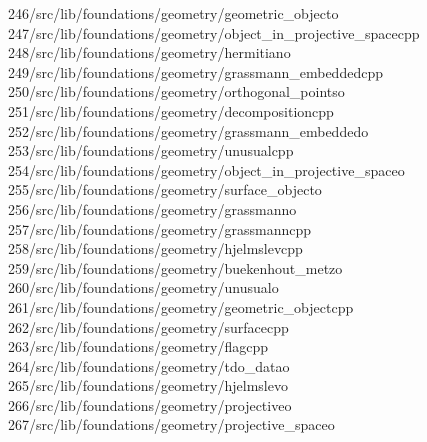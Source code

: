 \begin{tabbing}
246\>/src/lib/foundations/geometry/geometric\_objecto\\[0pt]
247\>/src/lib/foundations/geometry/object\_in\_projective\_spacecpp\\[0pt]
248\>/src/lib/foundations/geometry/hermitiano\\[0pt]
249\>/src/lib/foundations/geometry/grassmann\_embeddedcpp\\[0pt]
250\>/src/lib/foundations/geometry/orthogonal\_pointso\\[0pt]
251\>/src/lib/foundations/geometry/decompositioncpp\\[0pt]
252\>/src/lib/foundations/geometry/grassmann\_embeddedo\\[0pt]
253\>/src/lib/foundations/geometry/unusualcpp\\[0pt]
254\>/src/lib/foundations/geometry/object\_in\_projective\_spaceo\\[0pt]
255\>/src/lib/foundations/geometry/surface\_objecto\\[0pt]
256\>/src/lib/foundations/geometry/grassmanno\\[0pt]
257\>/src/lib/foundations/geometry/grassmanncpp\\[0pt]
258\>/src/lib/foundations/geometry/hjelmslevcpp\\[0pt]
259\>/src/lib/foundations/geometry/buekenhout\_metzo\\[0pt]
260\>/src/lib/foundations/geometry/unusualo\\[0pt]
261\>/src/lib/foundations/geometry/geometric\_objectcpp\\[0pt]
262\>/src/lib/foundations/geometry/surfacecpp\\[0pt]
263\>/src/lib/foundations/geometry/flagcpp\\[0pt]
264\>/src/lib/foundations/geometry/tdo\_datao\\[0pt]
265\>/src/lib/foundations/geometry/hjelmslevo\\[0pt]
266\>/src/lib/foundations/geometry/projectiveo\\[0pt]
267\>/src/lib/foundations/geometry/projective\_spaceo\\[0pt]

\end{tabbing}
